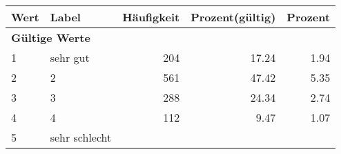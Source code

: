      \begin{longtable}{lXrrr}
     \toprule
     \textbf{Wert} & \textbf{Label} & \textbf{Häufigkeit} & \textbf{Prozent(gültig)} & \textbf{Prozent} \\
     \endhead
     \midrule
     \multicolumn{5}{l}{\textbf{Gültige Werte}}\\

     1 &
     \multicolumn{1}{X}{ sehr gut   } &


       \num{204} &
       \num[round-mode=places,round-precision=2]{17,24} &
         \num[round-mode=places,round-precision=2]{1,94} \\

     2 &
     \multicolumn{1}{X}{ 2   } &


       \num{561} &
       \num[round-mode=places,round-precision=2]{47,42} &
         \num[round-mode=places,round-precision=2]{5,35} \\

     3 &
     \multicolumn{1}{X}{ 3   } &


       \num{288} &
       \num[round-mode=places,round-precision=2]{24,34} &
         \num[round-mode=places,round-precision=2]{2,74} \\

     4 &
     \multicolumn{1}{X}{ 4   } &


       \num{112} &
       \num[round-mode=places,round-precision=2]{9,47} &
         \num[round-mode=places,round-precision=2]{1,07} \\

     5 &
     \multicolumn{1}{X}{ sehr schlecht   } &



\end{longtable}
